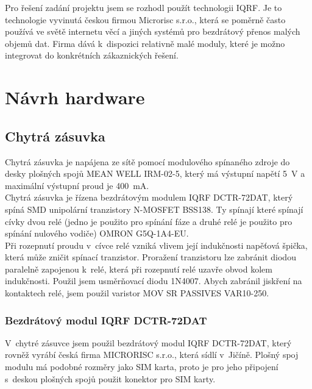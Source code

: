 \documentclass[12pt,a4paper,oneside]{article}
\begin{document}
Pro řešení zadání projektu jsem se rozhodl použít technologii IQRF. Je to technologie vyvinutá českou firmou Microrisc s.r.o., která se poměrně často používá ve světě internetu věcí a jiných systémů pro bezdrátový přenos malých objemů dat. Firma dává k~dispozici relativně malé moduly, které je možno integrovat do konkrétních zákaznických řešení.

\newpage

\section{Návrh hardware}

\subsection{Chytrá zásuvka}

Chytrá zásuvka je napájena ze sítě pomocí modulového spínaného zdroje do desky plošných spojů MEAN WELL IRM-02-5, který má výstupní napětí 5~V a maximální výstupní proud je 400~mA. \\

Chytrá zásuvka je řízena bezdrátovým modulem IQRF DCTR-72DAT, který spíná SMD unipolární tranzistory N-MOSFET BSS138. Ty spínají které spínají cívky dvou relé (jedno je použito pro spínání fáze a druhé relé je použito pro spínání nulového vodiče) OMRON G5Q-1A4-EU. \\

Při rozepnutí proudu v~cívce relé vzniká vlivem její indukčnosti napěťová špička, která může zničit spínací tranzistor. Proražení tranzistoru lze zabránit diodou paralelně zapojenou k~relé, která při rozepnutí relé uzavře obvod kolem indukčnosti. Použil jsem usměrňovací diodu 1N4007. Abych zabránil jiskření na kontaktech relé, jsem použil varistor MOV SR PASSIVES VAR10-250.

\newpage

\subsubsection{Bezdrátový modul IQRF DCTR-72DAT}

V~chytré zásuvce jsem použil bezdrátový modul IQRF DCTR-72DAT, který rovněž vyrábí česká firma MICRORISC s.r.o., která sídlí v~Jičíně. Plošný spoj modulu má podobné rozměry jako SIM karta, proto je pro jeho připojení s~deskou plošných spojů použit konektor pro SIM karty. \\ 
\end{document}
